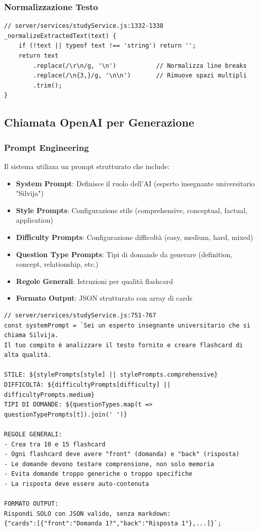 \documentclass[11pt,a4paper]{article}
\begin{document}
\subsubsection{Normalizzazione Testo}

\begin{lstlisting}[caption=Normalizzazione Testo Estratto]
// server/services/studyService.js:1332-1338
_normalizeExtractedText(text) {
    if (!text || typeof text !== 'string') return '';
    return text
        .replace(/\r\n/g, '\n')           // Normalizza line breaks
        .replace(/\n{3,}/g, '\n\n')       // Rimuove spazi multipli
        .trim();
}
\end{lstlisting}

\subsection{Chiamata OpenAI per Generazione}

\subsubsection{Prompt Engineering}

Il sistema utilizza un prompt strutturato che include:
\begin{itemize}
    \item \textbf{System Prompt}: Definisce il ruolo dell'AI (esperto insegnante universitario "Silvija")
    \item \textbf{Style Prompts}: Configurazione stile (comprehensive, conceptual, factual, application)
    \item \textbf{Difficulty Prompts}: Configurazione difficoltà (easy, medium, hard, mixed)
    \item \textbf{Question Type Prompts}: Tipi di domande da generare (definition, concept, relationship, etc.)
    \item \textbf{Regole Generali}: Istruzioni per qualità flashcard
    \item \textbf{Formato Output}: JSON strutturato con array di cards
\end{itemize}

\begin{lstlisting}[caption=Costruzione System Prompt]
// server/services/studyService.js:751-767
const systemPrompt = `Sei un esperto insegnante universitario che si chiama Silvija. 
Il tuo compito è analizzare il testo fornito e creare flashcard di alta qualità.

STILE: ${stylePrompts[style] || stylePrompts.comprehensive}
DIFFICOLTÀ: ${difficultyPrompts[difficulty] || difficultyPrompts.medium}
TIPI DI DOMANDE: ${questionTypes.map(t => questionTypePrompts[t]).join(' ')}

REGOLE GENERALI:
- Crea tra 10 e 15 flashcard
- Ogni flashcard deve avere "front" (domanda) e "back" (risposta)
- Le domande devono testare comprensione, non solo memoria
- Evita domande troppo generiche o troppo specifiche
- La risposta deve essere auto-contenuta

FORMATO OUTPUT:
Rispondi SOLO con JSON valido, senza markdown:
{"cards":[{"front":"Domanda 1?","back":"Risposta 1"},...]}`;
\end{lstlisting}
\end{document}
